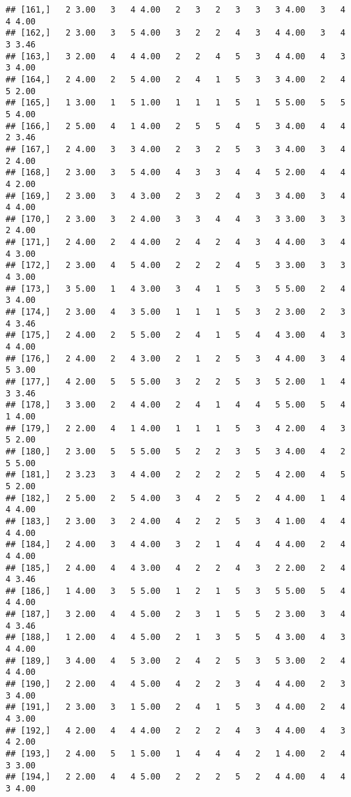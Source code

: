 \documentclass[]{article}
\begin{document}
\begin{verbatim}
## [161,]   2 3.00   3   4 4.00   2   3   2   3   3   3 4.00   3   4   4 4.00
## [162,]   2 3.00   3   5 4.00   3   2   2   4   3   4 4.00   3   4   3 3.46
## [163,]   3 2.00   4   4 4.00   2   2   4   5   3   4 4.00   4   3   3 4.00
## [164,]   2 4.00   2   5 4.00   2   4   1   5   3   3 4.00   2   4   5 2.00
## [165,]   1 3.00   1   5 1.00   1   1   1   5   1   5 5.00   5   5   5 4.00
## [166,]   2 5.00   4   1 4.00   2   5   5   4   5   3 4.00   4   4   2 3.46
## [167,]   2 4.00   3   3 4.00   2   3   2   5   3   3 4.00   3   4   2 4.00
## [168,]   2 3.00   3   5 4.00   4   3   3   4   4   5 2.00   4   4   4 2.00
## [169,]   2 3.00   3   4 3.00   2   3   2   4   3   3 4.00   3   4   4 4.00
## [170,]   2 3.00   3   2 4.00   3   3   4   4   3   3 3.00   3   3   2 4.00
## [171,]   2 4.00   2   4 4.00   2   4   2   4   3   4 4.00   3   4   4 3.00
## [172,]   2 3.00   4   5 4.00   2   2   2   4   5   3 3.00   3   3   4 3.00
## [173,]   3 5.00   1   4 3.00   3   4   1   5   3   5 5.00   2   4   3 4.00
## [174,]   2 3.00   4   3 5.00   1   1   1   5   3   2 3.00   2   3   4 3.46
## [175,]   2 4.00   2   5 5.00   2   4   1   5   4   4 3.00   4   3   4 4.00
## [176,]   2 4.00   2   4 3.00   2   1   2   5   3   4 4.00   3   4   5 3.00
## [177,]   4 2.00   5   5 5.00   3   2   2   5   3   5 2.00   1   4   3 3.46
## [178,]   3 3.00   2   4 4.00   2   4   1   4   4   5 5.00   5   4   1 4.00
## [179,]   2 2.00   4   1 4.00   1   1   1   5   3   4 2.00   4   3   5 2.00
## [180,]   2 3.00   5   5 5.00   5   2   2   3   5   3 4.00   4   2   5 5.00
## [181,]   2 3.23   3   4 4.00   2   2   2   2   5   4 2.00   4   5   5 2.00
## [182,]   2 5.00   2   5 4.00   3   4   2   5   2   4 4.00   1   4   4 4.00
## [183,]   2 3.00   3   2 4.00   4   2   2   5   3   4 1.00   4   4   4 4.00
## [184,]   2 4.00   3   4 4.00   3   2   1   4   4   4 4.00   2   4   4 4.00
## [185,]   2 4.00   4   4 3.00   4   2   2   4   3   2 2.00   2   4   4 3.46
## [186,]   1 4.00   3   5 5.00   1   2   1   5   3   5 5.00   5   4   4 4.00
## [187,]   3 2.00   4   4 5.00   2   3   1   5   5   2 3.00   3   4   4 3.46
## [188,]   1 2.00   4   4 5.00   2   1   3   5   5   4 3.00   4   3   4 4.00
## [189,]   3 4.00   4   5 3.00   2   4   2   5   3   5 3.00   2   4   4 4.00
## [190,]   2 2.00   4   4 5.00   4   2   2   3   4   4 4.00   2   3   3 4.00
## [191,]   2 3.00   3   1 5.00   2   4   1   5   3   4 4.00   2   4   4 3.00
## [192,]   4 2.00   4   4 4.00   2   2   2   4   3   4 4.00   4   3   4 2.00
## [193,]   2 4.00   5   1 5.00   1   4   4   4   2   1 4.00   2   4   3 3.00
## [194,]   2 2.00   4   4 5.00   2   2   2   5   2   4 4.00   4   4   3 4.00

\end{verbatim}
\end{document}
